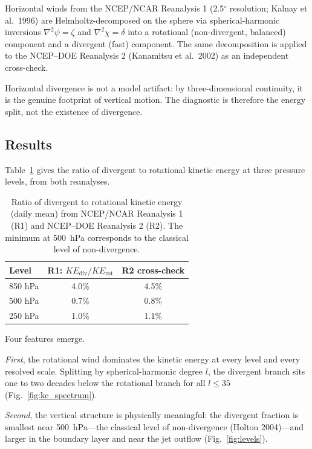 \documentclass[aps,prfluids,preprint,superscriptaddress,nofootinbib]{revtex4-2}
\begin{document}
Horizontal winds from the NCEP/NCAR Reanalysis 1 (2.5$^\circ$ resolution; Kalnay et al.\ 1996) are Helmholtz-decomposed on the sphere via spherical-harmonic inversions $\nabla^2\psi = \zeta$ and $\nabla^2\chi = \delta$ into a rotational (non-divergent, balanced) component and a divergent (fast) component. The same decomposition is applied to the NCEP--DOE Reanalysis 2 (Kanamitsu et al.\ 2002) as an independent cross-check.

Horizontal divergence is not a model artifact: by three-dimensional continuity, it is the genuine footprint of vertical motion. The diagnostic is therefore the energy split, not the existence of divergence.

\subsection{Results}

Table~\ref{tab:reanalysis} gives the ratio of divergent to rotational kinetic energy at three pressure levels, from both reanalyses.

\begin{table}[t]
\centering
\caption{Ratio of divergent to rotational kinetic energy (daily mean) from
NCEP/NCAR Reanalysis 1 (R1) and NCEP--DOE Reanalysis 2 (R2). The minimum at
500~hPa corresponds to the classical level of non-divergence.}
\label{tab:reanalysis}
\begin{tabular}{lcc}
\toprule
Level & R1: $KE_{\mathrm{div}}/KE_{\mathrm{rot}}$ &
R2 cross-check \\
\midrule
850 hPa & 4.0\% & 4.5\% \\
500 hPa & 0.7\% & 0.8\% \\
250 hPa & 1.0\% & 1.1\% \\
\bottomrule
\end{tabular}
\end{table}

Four features emerge.

\emph{First}, the rotational wind dominates the kinetic energy at every level and every resolved scale. Splitting by spherical-harmonic degree $l$, the divergent branch sits one to two decades below the rotational branch for all $l \leq 35$ (Fig.~\ref{fig:ke_spectrum}).

\emph{Second}, the vertical structure is physically meaningful: the divergent fraction is smallest near 500~hPa---the classical level of non-divergence (Holton 2004)---and larger in the boundary layer and near the jet outflow (Fig.~\ref{fig:levels}).
\end{document}
